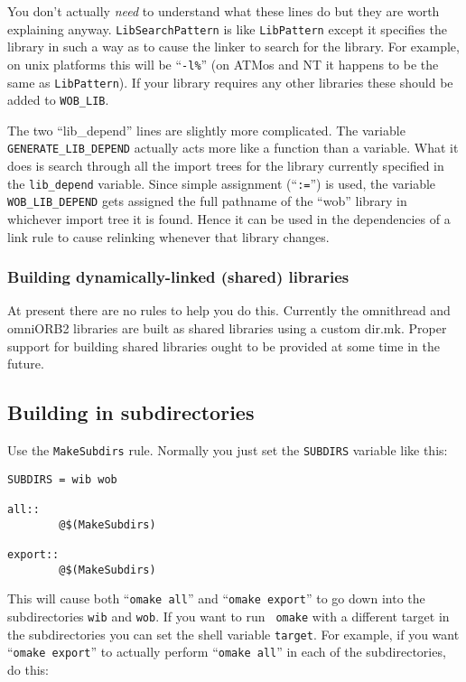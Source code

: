 \documentclass[11pt,twoside,onecolumn]{article}
\begin{document}
You don't actually {\em need} to understand what these lines do but they are
worth explaining anyway.  {\tt LibSearchPattern} is like {\tt LibPattern}
except it specifies the library in such a way as to cause the linker to search
for the library.  For example, on unix platforms this will be ``\verb|-l%|''
(on ATMos and NT it happens to be the same as {\tt LibPattern}).  If your
library requires any other libraries these should be added to \verb|WOB_LIB|.

The two ``lib\_depend'' lines are slightly more complicated.  The variable
\verb|GENERATE_LIB_DEPEND| actually acts more like a function than a
variable. What it does is search through all the import trees for the library
currently specified in the \verb|lib_depend| variable.  Since simple assignment
(``{\tt :=}'') is used, the variable \verb|WOB_LIB_DEPEND| gets assigned the
full pathname of the ``wob'' library in whichever import tree it is found.
Hence it can be used in the dependencies of a link rule to cause relinking
whenever that library changes.

\subsubsection{Building dynamically-linked (shared) libraries}

At present there are no rules to help you do this.  Currently the omnithread
and omniORB2 libraries are built as shared libraries using a custom dir.mk.
Proper support for building shared libraries ought to be provided at some time
in the future.


\subsection{Building in subdirectories}

Use the {\tt MakeSubdirs} rule.  Normally you just set the {\tt SUBDIRS}
variable like this:

{\footnotesize \begin{verbatim}
SUBDIRS = wib wob

all::
        @$(MakeSubdirs)

export::
        @$(MakeSubdirs)
\end{verbatim}}

This will cause both ``{\tt omake all}'' and ``{\tt omake export}'' to go down
into the subdirectories {\tt wib} and {\tt wob}.  If you want to run {\tt
omake} with a different target in the subdirectories you can set the shell
variable {\tt target}.  For example, if you want ``{\tt omake export}'' to
actually perform ``{\tt omake all}'' in each of the subdirectories, do this:
\end{document}
